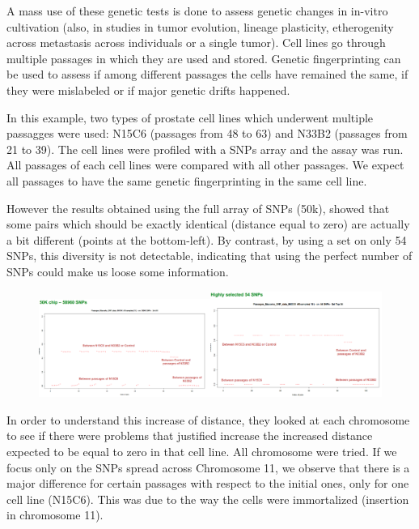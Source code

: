 A mass use of these genetic tests is done to assess genetic changes in in-vitro cultivation (also, in studies in tumor evolution, lineage plasticity, etherogenity across metastasis across individuals or a single tumor).
Cell lines go through multiple passages in which they are used and stored. Genetic fingerprinting can be used to assess if among different passages the cells have remained the same, if they were mislabeled or if major genetic drifts happened.

In this example, two types of prostate cell lines which underwent multiple passagges were used: N15C6 (passages from 48 to 63) and N33B2 (passages from 21 to 39).
The cell lines were profiled with a SNPs array and the assay was run.
All passages of each cell lines were compared with all other passages. We expect all passages to have the same genetic fingerprinting in the same cell line.  

However the results obtained using the full array of SNPs (50k), showed that some pairs which should be exactly identical (distance equal to zero) are actually a bit different (points at the bottom-left).
By contrast, by using a set on only 54 SNPs, this diversity is not detectable, indicating  that using the perfect number of SNPs could make us loose some information. 

\begin{figure}
	\centering
	\includegraphics[width=0.5\textwidth]{50k.png}\quad\includegraphics[width=0.5\textwidth]{54_snps.PNG}
	\caption{\label{fig: cell_lines}}
\end{figure}

In order to understand this increase of distance, they looked at each chromosome to see if there were problems that justified increase the increased distance expected to be equal to zero in that cell line. All chromosome were tried. If we focus only on the SNPs spread across Chromosome 11, we observe that there is a major difference for certain passages with respect to the initial ones, only for one cell line (N15C6). This was due to the way the cells were immortalized (insertion in chromosome 11).


